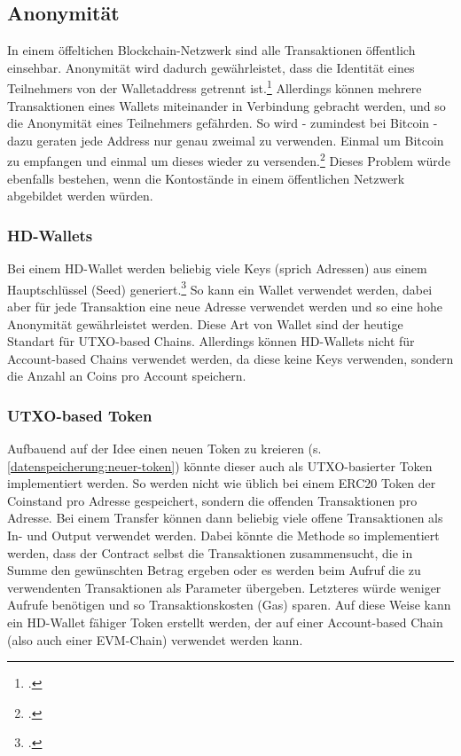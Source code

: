 \subsection{Anonymität}
In einem öffeltichen Blockchain-Netzwerk sind alle Transaktionen öffentlich einsehbar.
Anonymität wird dadurch gewährleistet, dass die Identität eines Teilnehmers von der Walletaddress getrennt ist.\footcite[Vgl.][6]{q4}
Allerdings können mehrere Transaktionen eines Wallets miteinander in Verbindung gebracht werden, und so die Anonymität eines Teilnehmers gefährden. So wird - zumindest bei Bitcoin - dazu geraten jede Address nur genau zweimal zu verwenden. Einmal um Bitcoin zu empfangen und einmal um dieses wieder zu versenden.\footcite[Vgl.][]{w15}
Dieses Problem würde ebenfalls bestehen, wenn die Kontostände in einem öffentlichen Netzwerk abgebildet werden würden.



\subsubsection{HD-Wallets}
Bei einem HD-Wallet werden beliebig viele Keys (sprich Adressen) aus einem Hauptschlüssel (Seed) generiert.\footcite[Vgl. hierzu und weiterführend][S. 8 ff\adddot]{q9}
So kann ein Wallet verwendet werden, dabei aber für jede Transaktion eine neue Adresse verwendet werden und so eine hohe Anonymität gewährleistet werden.
Diese Art von Wallet sind der heutige Standart für UTXO-based Chains.
Allerdings können HD-Wallets nicht für Account-based Chains verwendet werden, da diese keine Keys verwenden, sondern die Anzahl an Coins pro Account speichern.

\subsubsection{UTXO-based Token}
Aufbauend auf der Idee einen neuen Token zu kreieren (s. \ref{datenspeicherung:neuer-token}) könnte dieser auch als UTXO-basierter Token implementiert werden.
So werden nicht wie üblich bei einem ERC20 Token der Coinstand pro Adresse gespeichert, sondern die offenden Transaktionen pro Adresse.
Bei einem Transfer können dann beliebig viele offene Transaktionen als In- und Output verwendet werden.
Dabei könnte die Methode so implementiert werden, dass der Contract selbst die Transaktionen zusammensucht, die in Summe den gewünschten Betrag ergeben oder es werden beim Aufruf die zu verwendenten Transaktionen als Parameter übergeben.
Letzteres würde weniger Aufrufe benötigen und so Transaktionskosten (Gas) sparen.
Auf diese Weise kann ein HD-Wallet fähiger Token erstellt werden, der auf einer Account-based Chain (also auch einer EVM-Chain) verwendet werden kann.